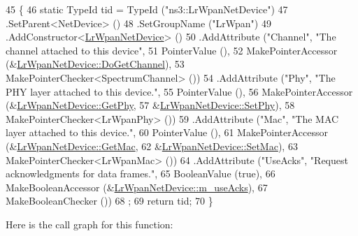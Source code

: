 \begin{DoxyCode}
45 \{
46   \textcolor{keyword}{static} TypeId tid = TypeId (\textcolor{stringliteral}{"ns3::LrWpanNetDevice"})
47     .SetParent<NetDevice> ()
48     .SetGroupName (\textcolor{stringliteral}{"LrWpan"})
49     .AddConstructor<\hyperlink{classns3_1_1LrWpanNetDevice_a13831cf68e3c1a3e052509e3e2dd2266}{LrWpanNetDevice}> ()
50     .AddAttribute (\textcolor{stringliteral}{"Channel"}, \textcolor{stringliteral}{"The channel attached to this device"},
51                    PointerValue (),
52                    MakePointerAccessor (&\hyperlink{classns3_1_1LrWpanNetDevice_a10023e92e2b456edf04b85a7d5a6eee9}{LrWpanNetDevice::DoGetChannel}),
53                    MakePointerChecker<SpectrumChannel> ())
54     .AddAttribute (\textcolor{stringliteral}{"Phy"}, \textcolor{stringliteral}{"The PHY layer attached to this device."},
55                    PointerValue (),
56                    MakePointerAccessor (&\hyperlink{classns3_1_1LrWpanNetDevice_ae5f566c0d7718541c5520ac8508bd140}{LrWpanNetDevice::GetPhy},
57                                         &\hyperlink{classns3_1_1LrWpanNetDevice_a521c26ef227a41d835ee5ee6ed783480}{LrWpanNetDevice::SetPhy}),
58                    MakePointerChecker<LrWpanPhy> ())
59     .AddAttribute (\textcolor{stringliteral}{"Mac"}, \textcolor{stringliteral}{"The MAC layer attached to this device."},
60                    PointerValue (),
61                    MakePointerAccessor (&\hyperlink{classns3_1_1LrWpanNetDevice_a1937e69c08baf66ebb5c9d937e52659a}{LrWpanNetDevice::GetMac},
62                                         &\hyperlink{classns3_1_1LrWpanNetDevice_aa36a97b6898c9b5b2dd4f6d956eda590}{LrWpanNetDevice::SetMac}),
63                    MakePointerChecker<LrWpanMac> ())
64     .AddAttribute (\textcolor{stringliteral}{"UseAcks"}, \textcolor{stringliteral}{"Request acknowledgments for data frames."},
65                    BooleanValue (\textcolor{keyword}{true}),
66                    MakeBooleanAccessor (&\hyperlink{classns3_1_1LrWpanNetDevice_a2e9f71d0b393e1d0030869b2bd7b2ab8}{LrWpanNetDevice::m\_useAcks}),
67                    MakeBooleanChecker ())
68   ;
69   \textcolor{keywordflow}{return} tid;
70 \}
\end{DoxyCode}


Here is the call graph for this function\+:


